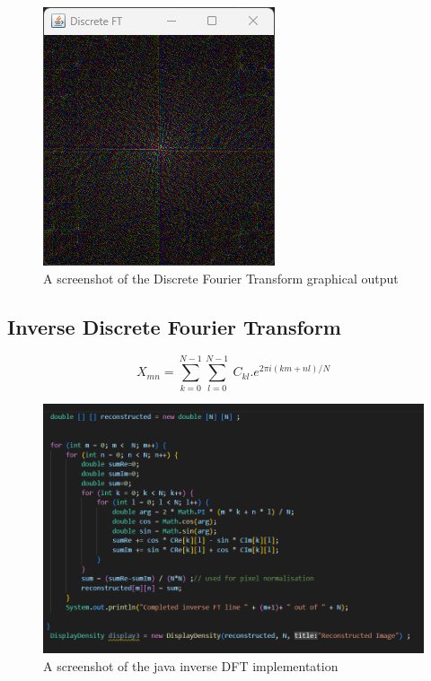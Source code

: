     \begin{figure}[H]
        \centering
        \includegraphics[width=0.8\columnwidth]{Figures/Week 1/W1-FT.png}
        \caption{A screenshot of the Discrete Fourier Transform graphical output}
        \label{fig:wolf-DFT}
    \end{figure}
    
    
    \subsection{Inverse Discrete Fourier Transform}


        \begin{center}
        \begin{equation}
            X_{mn} = \sum_{k=0}^{N-1} \sum_{l=0}^{N-1}\ C_{kl} . e^{2\pi i(km+nl)/N}
            \label{fig:equation-InverseFT}
        \end{equation}  
        \end{center}

        \begin{figure}[H]
            \centering
            \includegraphics[width=1\columnwidth]{Figures/Week 1/W1-SimpleFT-InverseDFT-Implementation.png}
            \caption{A screenshot of the java inverse DFT implementation}
            \label{fig:inverse-DFT-Code}
    \end{figure}
    
